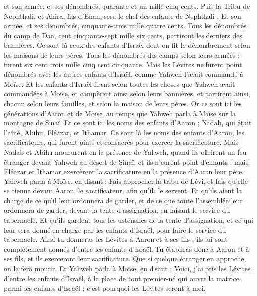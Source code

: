 \begin{multicols}{2}
et son armée, et ses dénombrés, quarante et un mille cinq cents.
Puis la Tribu de Nephthali, et Ahira, fils d'Enan, sera le chef des enfants de Nephthali ;
Et son armée, et ses dénombrés, cinquante-trois mille quatre cents.
Tous les dénombrés du camp de Dan, cent cinquante-sept mille six cents, partiront les derniers des bannières.
Ce sont là ceux des enfants d'Israël dont on fit le dénombrement selon les maisons de leurs pères. Tous les dénombrés des camps selon leurs armées ; furent six cent trois mille cinq cent cinquante.
Mais les Lévites ne furent point dénombrés avec les autres enfants d'Israël, comme Yahweh l'avait commandé à Moïse.
Et les enfants d'Israël firent selon toutes les choses que Yahweh avait commandées à Moïse, et campèrent ainsi selon leurs bannières, et partirent ainsi, chacun selon leurs familles, et selon la maison de leurs pères.
\VerseOne{}Or ce sont ici les générations d'Aaron et de Moïse, au temps que Yahweh parla à Moïse sur la montagne de Sinaï.
Et ce sont ici les noms des enfants d'Aaron ; Nadab, qui était l'aîné, Abihu, Eléazar, et Ithamar.
Ce sont là les noms des enfants d'Aaron, les sacrificateurs, qui furent oints et consacrés pour exercer la sacrificature.
Mais Nadab et Abihu moururent en la présence de Yahweh, quand ils offrirent un feu étranger devant Yahweh au désert de Sinaï, et ils n'eurent point d'enfants ; mais Eléazar et Ithamar exercèrent la sacrificature en la présence d'Aaron leur père.
Yahweh parla à Moïse, en disant :
Fais approcher la tribu de Lévi, et fais qu'elle se tienne devant Aaron, le sacrificateur, afin qu'ils le servent.
Et qu'ils aient la charge de ce qu'il leur ordonnera de garder, et de ce que toute l'assemblée leur ordonnera de garder, devant la tente d'assignation, en faisant le service du tabernacle.
Et qu'ils gardent tous les ustensiles de la tente d'assignation, et ce qui leur sera donné en charge par les enfants d'Israël, pour faire le service du tabernacle.
Ainsi tu donneras les Lévites à Aaron et à ses fils ; ils lui sont complétement donnés d'entre les enfants d'Israël.
Tu établiras donc à Aaron et à ses fils, et ils exerceront leur sacrificature. Que si quelque étranger en approche, on le fera mourir.
Et Yahweh parla à Moïse, en disant :
Voici, j'ai pris les Lévites d'entre les enfants d'Israël, à la place de tout premier-né qui ouvre la matrice parmi les enfants d'Israël ; c'est pourquoi les Lévites seront à moi.

\end{multicols}
